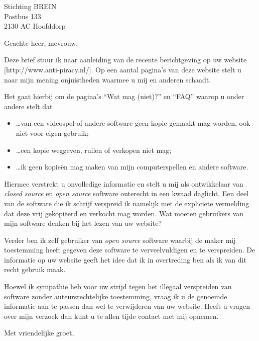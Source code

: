 \documentclass[a4paper,11pt]{brief}
\date{22 februari 2006}
\begin{document}
\begin{letter}{Stichting BREIN\\
Postbus 133\\
2130 AC Hoofddorp}

\opening{Geachte heer, mevrouw,}

Deze brief stuur ik naar aanleiding van de recente berichtgeving op
uw website [http://www.anti-piracy.nl/]. Op een aantal pagina's van
deze website stelt u naar mijn mening onjuistheden waarmee u mij en
anderen schaadt.

Het gaat hierbij om de pagina's ``Wat mag (niet)?'' en ``FAQ'' waarop
u onder andere stelt dat

\begin{itemize}
\item \ldots van een videospel of andere software geen kopie gemaakt mag
worden, ook niet voor eigen gebruik;
\item \ldots een kopie weggeven, ruilen of verkopen niet mag;
\item \ldots ik geen kopie\"en mag maken van mijn computerspellen en andere
software.
\end{itemize}

Hiermee verstrekt u onvolledige informatie en stelt u mij als
ontwikkelaar van \emph{closed source} en \emph{open source} software
onterecht in een kwaad daglicht. Een deel van de software die ik
schrijf verspreid ik namelijk met de expliciete vermelding dat deze
vrij gekopi\"eerd en verkocht mag worden. Wat moeten gebruikers van
mijn software denken bij het lezen van uw website?

Verder ben ik zelf gebruiker van \emph{open source} software waarbij
de maker mij toestemming heeft gegeven deze software te
verveelvuldigen en te verspreiden. De informatie op uw website geeft
het idee dat ik in overtreding ben als ik van dit recht gebruik
maak.

Hoewel ik sympathie heb voor uw strijd tegen het illegaal verspreiden
van software zonder auteursrechtelijke toestemming, vraag ik u de
genoemde informatie aan te passen dan wel te verwijderen van uw
website. Heeft u vragen over mijn verzoek dan kunt u te allen tijde
contact met mij opnemen.

\closing{Met vriendelijke groet,}

\end{letter}
\end{document}
